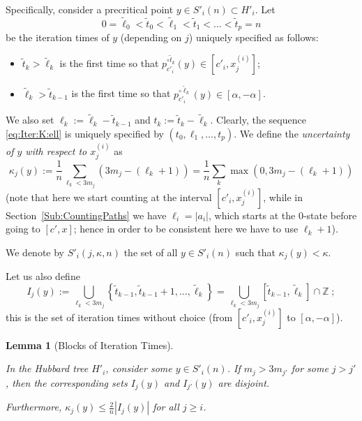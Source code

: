 \documentclass[12pt]{amsart}
\newcommand{\Z}{\mathbb Z}
\newcommand{\0}{\texttt{0}}
\newcommand{\1}{\texttt{1}}
\newtheorem{lemma}[theorem]{Lemma}
\theoremstyle{definition}
\numberwithin{equation}{section}
\newcommand{\lineclear}{\rule{0pt}{2pt}\newline}
\begin{document}
Specifically, consider a precritical point $y\in S'_i(n)\subset H'_i$.  Let  \begin{equation}
 \label{eq:Iter:K:ell}0=\tilde \ell_0 <\tilde t_0<\tilde \ell_1<\tilde t_1< \dots < \tilde t_p=n
 \end{equation} be the iteration times of $y$ (depending on $j$) uniquely specified as follows:
\begin{itemize}
\item 
$\tilde t_k>\tilde \ell_k$  is the first time so that $p^{\circ \tilde t_k}_{c'_i}(y) \in [ c'_i, x_{j}^{(i)}]$;
\item 
$\tilde \ell_k>\tilde t_{k-1}$  is the first time so that $p^{\circ \tilde \ell_k}_{c'_i}(y)\in [\alpha,-\alpha]$.
\end{itemize}


We also set $\ell_k:=\tilde \ell_k- \tilde t_{k-1}$ and $t_k:= \tilde t_k-\tilde \ell_k$. Clearly, the sequence \eqref{eq:Iter:K:ell} is uniquely specified by $(t_0,\ell_1, \dots, t_p)$.
 We define the \emph{uncertainty of $y$ with respect to $x_j^{(i)}$} as 
\[
\kappa_j(y):= \frac 1 n \sum_{\ell_k<3m_j}(3m_j- (\ell_k+1))
= \frac 1 n  \sum_k  \max(0,3m_j-(\ell_k+1))
\]
(note that here we start counting at the interval $[c'_i,x_j^{(i)}]$, while in Section~\ref{Sub:CountingPaths} we have $\ell_i=|a_i|$, which starts at the $0$-state before going to $[c',x]$; hence in order to be consistent here we have to use $\ell_k +1$). 


We denote by $S'_i(j,\kappa,n)$ the set of all $y\in S'_i(n)$ such that $\kappa_j(y)<\kappa$.

Let us also define 
\[
I_j(y):= \bigcup_{\ell_k<3m_j} \left\{\tilde t_{k-1}, \tilde t_{k-1}+1,\dots, \tilde \ell_{k} \right\}
= \bigcup_{\ell_k<3m_j} \left[ \tilde t_{k-1},\tilde \ell_k \right]\cap\Z
\;;
\]
this is the set of iteration times without choice (from $[c'_i,x^{(i)}_j]$ to $[\alpha,-\alpha]$).


\begin{lemma}[Blocks of Iteration Times]
\label{lem:I_j} \lineclear
In the Hubbard tree $H'_i$, consider some $y\in S'_i(n)$.
If $m_j > 3 m_{j'}$ for some $j>j'$, then the corresponding sets $I_j(y)$ and $I_{j'}(y)$ are disjoint.

Furthermore, 
\( \displaystyle \kappa_j(y) \le  \frac 2 n |I_j(y)|\) for all $j\ge i$. 
\end{lemma}
\end{document}
